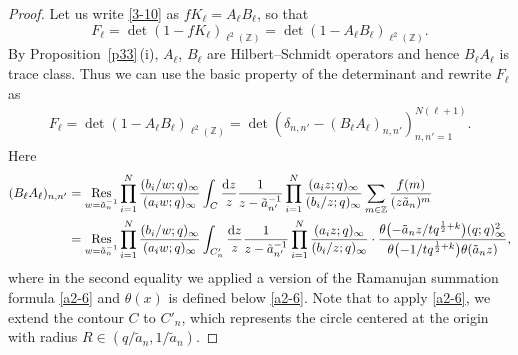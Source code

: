 \documentclass[pdftex]{sigma}
\numberwithin{equation}{section}
\def\i{\infty}
\def\Z{\mathbb{Z}}
\begin{document}
 \begin{proof}
 Let us write \eqref{3-10} as $f K_{\ell} = A_{\ell} B_{\ell}$, so that
 \[
 F_{\ell}=\det(1-fK_{\ell})_{\ell^2(\Z)}=\det(1-A_{\ell}B_{\ell})_{\ell^2(\Z)}.
 \]
 By Proposition~\ref{p33}\,(i), $A_{\ell}$, $B_{\ell}$ are
 Hilbert--Schmidt operators and hence $B_{\ell}A_{\ell}$ is trace class.
 Thus we can use the basic property of the determinant \smash{$\det(1-A_{\ell}B_{\ell})_{\ell^2(\Z)}=\det(\delta_{i,j}-(B_{\ell}A_{\ell})_{i,j})_{i,j=1}^{N(\ell+1)}$}
 and rewrite $F_{\ell}$ as
 \begin{align}
 \label{3-17d}
 F_{\ell}=\det(1-A_{\ell}B_{\ell})_{\ell^2(\Z)}
 =\det(\delta_{n,n'}-(B_{\ell}A_{\ell})_{n,n'})_{n,n'=1}^{N(\ell+1)}.
 \end{align}
Here
\begin{align*}%
 (B_{\ell}A_{\ell})_{n,n'}
 &=
 \underset{w=\tilde{a}_n^{-1}}{\text{Res}}
 \prod_{i=1}^N\frac{(b_i/w;q)_{\i}}{(a_i w;q)_{\i}}
 \int_C\frac{{\rm d}z}{z}
 \frac{1}{z-\tilde{a}_{n'}^{-1}}
 \prod_{i=1}^N\frac{(a_i z;q)_{\i}}{(b_i/z;q)_{\i}}
 \sum_{m\in\Z}\frac{f(m)}{(z\tilde{a}_{n})^m}
 \\
 &=
 \underset{w=\tilde{a}_{n}^{-1}}{\text{Res}}
 \prod_{i=1}^N\frac{(b_i/w;q)_{\i}}{(a_i w;q)_{\i}}
 \int_{C_{n}'}\frac{{\rm d}z}{z}
 \frac{1}{z-\tilde{a}_{n'}^{-1}}
 \prod_{i=1}^N\frac{(a_i z;q)_{\i}}{(b_i/z;q)_{\i}}
 \cdot
 \frac{\theta\bigl(-\tilde{a}_{n}z/tq^{\frac12+k}\bigr)(q;q)_{\i}^2}{\theta\bigl(-1/tq^{\frac12+k}\bigr)\theta(\tilde{a}_n z)},
\end{align*}
 where in the second equality we applied a version of the Ramanujan summation formula \eqref{a2-6} and $\theta(x)$ is defined below \eqref{a2-6}. Note that to apply
 \eqref{a2-6}, we extend the contour $C$ to $C'_n$,
 which represents the circle centered at the origin with radius $R\in(q/\tilde{a}_n,1/\tilde{a}_n)$.


\end{proof}
\end{document}
